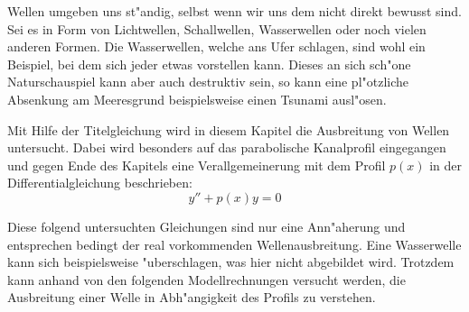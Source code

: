 Wellen umgeben uns st"andig, selbst wenn wir uns dem nicht direkt bewusst sind. 
Sei es in Form von Lichtwellen, Schallwellen, Wasserwellen oder noch vielen 
anderen Formen. Die Wasserwellen, welche ans Ufer schlagen, sind wohl ein 
Beispiel, bei dem sich jeder etwas vorstellen kann. Dieses an sich sch"one 
Naturschauspiel kann aber auch destruktiv sein, so kann eine pl"otzliche 
Absenkung am Meeresgrund beispielsweise einen Tsunami ausl"osen.

Mit Hilfe der Titelgleichung wird in diesem Kapitel die Ausbreitung von Wellen 
untersucht. Dabei wird besonders auf das parabolische Kanalprofil eingegangen 
und gegen Ende des Kapitels eine Verallgemeinerung mit dem Profil $p(x)$ in der 
Differentialgleichung beschrieben:
\begin{equation*}
y'' + p(x) y = 0
\end{equation*}

Diese folgend untersuchten Gleichungen sind nur eine Ann"aherung und 
entsprechen bedingt der real vorkommenden Wellenausbreitung. Eine Wasserwelle 
kann sich beispielsweise "uberschlagen, was hier nicht abgebildet wird. 
Trotzdem kann anhand von den folgenden Modellrechnungen versucht werden, die 
Ausbreitung einer Welle in Abh"angigkeit des Profils zu verstehen.
